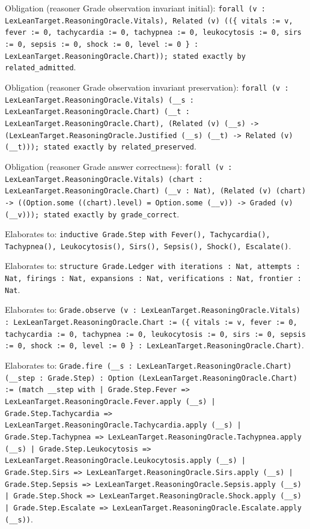 \documentclass[11pt]{article}
\begin{document}
\noindent Obligation (reasoner Grade observation invariant initial): \texttt{forall (v : LexLeanTarget.ReasoningOracle.Vitals), Related (v) ((\{ vitals := v, fever := 0, tachycardia := 0, tachypnea := 0, leukocytosis := 0, sirs := 0, sepsis := 0, shock := 0, level := 0 \} : LexLeanTarget.ReasoningOracle.Chart)); stated exactly by related\_admitted}.\par
\noindent Obligation (reasoner Grade observation invariant preservation): \texttt{forall (v : LexLeanTarget.ReasoningOracle.Vitals) (\_\_s : LexLeanTarget.ReasoningOracle.Chart) (\_\_t : LexLeanTarget.ReasoningOracle.Chart), (Related (v) (\_\_s) -> (LexLeanTarget.ReasoningOracle.Justified (\_\_s) (\_\_t) -> Related (v) (\_\_t))); stated exactly by related\_preserved}.\par
\noindent Obligation (reasoner Grade answer correctness): \texttt{forall (v : LexLeanTarget.ReasoningOracle.Vitals) (chart : LexLeanTarget.ReasoningOracle.Chart) (\_\_v : Nat), (Related (v) (chart) -> ((Option.some ((chart).level) = Option.some (\_\_v)) -> Graded (v) (\_\_v))); stated exactly by grade\_correct}.\par
\noindent Elaborates to: \texttt{inductive Grade.Step with Fever(), Tachycardia(), Tachypnea(), Leukocytosis(), Sirs(), Sepsis(), Shock(), Escalate()}.\par
\noindent Elaborates to: \texttt{structure Grade.Ledger with iterations : Nat, attempts : Nat, firings : Nat, expansions : Nat, verifications : Nat, frontier : Nat}.\par
\noindent Elaborates to: \texttt{Grade.observe (v : LexLeanTarget.ReasoningOracle.Vitals) : LexLeanTarget.ReasoningOracle.Chart := (\{ vitals := v, fever := 0, tachycardia := 0, tachypnea := 0, leukocytosis := 0, sirs := 0, sepsis := 0, shock := 0, level := 0 \} : LexLeanTarget.ReasoningOracle.Chart)}.\par
\noindent Elaborates to: \texttt{Grade.fire (\_\_s : LexLeanTarget.ReasoningOracle.Chart) (\_\_step : Grade.Step) : Option (LexLeanTarget.ReasoningOracle.Chart) := (match \_\_step with | Grade.Step.Fever => LexLeanTarget.ReasoningOracle.Fever.apply (\_\_s) | Grade.Step.Tachycardia => LexLeanTarget.ReasoningOracle.Tachycardia.apply (\_\_s) | Grade.Step.Tachypnea => LexLeanTarget.ReasoningOracle.Tachypnea.apply (\_\_s) | Grade.Step.Leukocytosis => LexLeanTarget.ReasoningOracle.Leukocytosis.apply (\_\_s) | Grade.Step.Sirs => LexLeanTarget.ReasoningOracle.Sirs.apply (\_\_s) | Grade.Step.Sepsis => LexLeanTarget.ReasoningOracle.Sepsis.apply (\_\_s) | Grade.Step.Shock => LexLeanTarget.ReasoningOracle.Shock.apply (\_\_s) | Grade.Step.Escalate => LexLeanTarget.ReasoningOracle.Escalate.apply (\_\_s))}.\par
\end{document}

